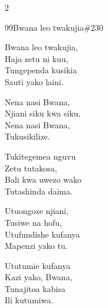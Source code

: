 \begin{multicols}{2}
\begin{hymn}{99}{Bwana leo twakujia}{\#230}
\begin{stanza}
Bwana leo twakujia,\\
Haja zetu ni kuu,\\
Tungependa kusikia\\
Sauti yako laini.
\end{stanza}
\begin{chorus}
Nena nasi Bwana,\\
Njiani siku kwa siku,\\
Nena nasi Bwana,\\
Tukusikilize.
\end{chorus}
\begin{stanza}
Tukitegemea nguvu\\
Zetu tutakosa,\\
Bali kwa uwezo wako\\
Tutashinda daima.
\end{stanza}
\begin{stanza}
Utuongoze njiani,\\
Tusiwe na hofu,\\
Utufundishe kufanya\\
Mapenzi yako tu.
\end{stanza}
\begin{stanza}
Ututumie kufanya\\
Kazi yako, Bwana,\\
Tunajitoa kabisa\\
Ili kutumiwa.
\end{stanza}
\end{hymn}


\end{multicols}
